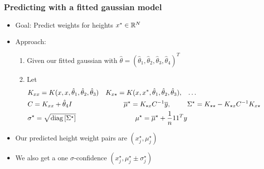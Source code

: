 \documentclass[10pt,aspectratio=169,handout]{beamer}
\begin{document}
\begin{frame}
    \frametitle{Predicting with a fitted gaussian model}

    \begin{itemize}
        \item Goal: Predict weights for heights $x^*\in\mathbb{R}^N$
        \item Approach: \begin{enumerate}
            \item Given our fitted gaussian with $\hat{\theta}=(\hat{\theta}_1,\hat{\theta}_2,\hat{\theta}_3,\hat{\theta}_4)^T$
            \item Let
            \begin{align*}
                &K_{xx}=K(x,x,\hat{\theta}_1,\hat{\theta}_2,\hat{\theta}_3)  &K_{x\star}=K(x,x^*,\hat{\theta}_1,\hat{\theta}_2,\hat{\theta}_3), \hspace{3mm}& \dots\\
                &C=K_{xx}+\hat{\theta}_4 I    &\overline{\mu}^\star = K_{\star x}C^{-1}\overline{y},\hspace{9mm}&\Sigma^\star = K_{\star \star}-K_{\star x} C^{-1} K_{x\star}\\
                &\sigma^\star = \sqrt{\text{diag}\left[\Sigma^\star \right]}\hspace{9mm}&\mu^\star = \overline{\mu}^\star +\frac{1}{n}11^Ty
            \end{align*}
        \end{enumerate}
        \item Our predicted height weight pairs are $(x_j^\star,\mu_j^\star)$
        \item We also get a one $\sigma$-confidence $(x_j^\star, \mu_j^\star\pm \sigma_j^\star)$
    \end{itemize}

\end{frame}
\end{document}
